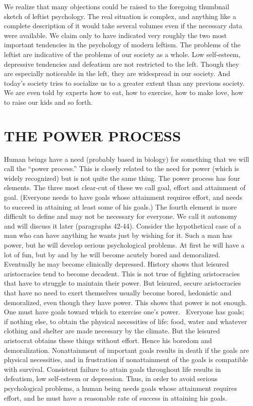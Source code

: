  We realize that many objections could be raised to the foregoing thumbnail sketch of leftist psychology. The real situation is complex, and anything like a complete description of it would take several volumes even if the necessary data were available. We claim only to have indicated very roughly the two most important tendencies in the psychology of modern leftism.
 The problems of the leftist are indicative of the problems of our society as a whole. Low self-esteem, depressive tendencies and defeatism are not restricted to the left. Though they are especially noticeable in the left, they are widespread in our society. And today’s society tries to socialize us to a greater extent than any previous society. We are even told by experts how to eat, how to exercise, how to make love, how to raise our kids and so forth.

\chapter{THE POWER PROCESS}

 Human beings have a need (probably based in biology) for something that we will call the “power process.” This is closely related to the need for power (which is widely recognized) but is not quite the same thing. The power process has four elements. The three most clear-cut of these we call goal, effort and attainment of goal. (Everyone needs to have goals whose attainment requires effort, and needs to succeed in attaining at least some of his goals.) The fourth element is more difficult to define and may not be necessary for everyone. We call it autonomy and will discuss it later (paragraphs 42-44).
 Consider the hypothetical case of a man who can have anything he wants just by wishing for it. Such a man has power, but he will develop serious psychological problems. At first he will have a lot of fun, but by and by he will become acutely bored and demoralized. Eventually he may become clinically depressed. History shows that leisured aristocracies tend to become decadent. This is not true of fighting aristocracies that have to struggle to maintain their power. But leisured, secure aristocracies that have no need to exert themselves usually become bored, hedonistic and demoralized, even though they have power. This shows that power is not enough. One must have goals toward which to exercise one’s power.
~Everyone has goals; if nothing else, to obtain the physical necessities of life: food, water and whatever clothing and shelter are made necessary by the climate. But the leisured aristocrat obtains these things without effort. Hence his boredom and demoralization.
 Nonattainment of important goals results in death if the goals are physical necessities, and in frustration if nonattainment of the goals is compatible with survival. Consistent failure to attain goals throughout life results in defeatism, low self-esteem or depression.
 Thus, in order to avoid serious psychological problems, a human being needs goals whose attainment requires effort, and he must have a reasonable rate of success in attaining his goals.

